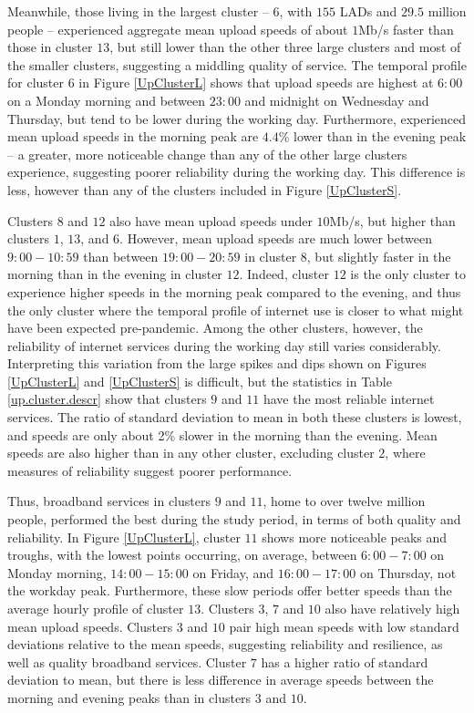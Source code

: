 \documentclass[]{interact}
\theoremstyle{plain}%
\theoremstyle{definition}
\theoremstyle{remark}
\begin{document}
Meanwhile, those living in the largest cluster -- \(6\), with \(155\)
LADs and \(29.5\) million people -- experienced aggregate mean upload
speeds of about \(1\)Mb/s faster than those in cluster \(13\), but still
lower than the other three large clusters and most of the smaller
clusters, suggesting a middling quality of service. The temporal profile
for cluster \(6\) in Figure \ref{UpClusterL} shows that upload speeds
are highest at \(6:00\) on a Monday morning and between \(23:00\) and
midnight on Wednesday and Thursday, but tend to be lower during the
working day. Furthermore, experienced mean upload speeds in the morning
peak are \(4.4\)\% lower than in the evening peak -- a greater, more
noticeable change than any of the other large clusters experience,
suggesting poorer reliability during the working day. This difference is
less, however than any of the clusters included in Figure
\ref{UpClusterS}.

Clusters \(8\) and \(12\) also have mean upload speeds under \(10\)Mb/s,
but higher than clusters \(1\), \(13\), and \(6\). However, mean upload
speeds are much lower between \(9:00-10:59\) than between
\(19:00-20:59\) in cluster \(8\), but slightly faster in the morning
than in the evening in cluster \(12\). Indeed, cluster \(12\) is the
only cluster to experience higher speeds in the morning peak compared to
the evening, and thus the only cluster where the temporal profile of
internet use is closer to what might have been expected pre-pandemic.
Among the other clusters, however, the reliability of internet services
during the working day still varies considerably. Interpreting this
variation from the large spikes and dips shown on Figures
\ref{UpClusterL} and \ref{UpClusterS} is difficult, but the statistics
in Table \ref{up.cluster.descr} show that clusters \(9\) and \(11\) have
the most reliable internet services. The ratio of standard deviation to
mean in both these clusters is lowest, and speeds are only about 2\%
slower in the morning than the evening. Mean speeds are also higher than
in any other cluster, excluding cluster \(2\), where measures of
reliability suggest poorer performance.

Thus, broadband services in clusters \(9\) and \(11\), home to over
twelve million people, performed the best during the study period, in
terms of both quality and reliability. In Figure \ref{UpClusterL},
cluster \(11\) shows more noticeable peaks and troughs, with the lowest
points occurring, on average, between \(6:00-7:00\) on Monday morning,
\(14:00-15:00\) on Friday, and \(16:00-17:00\) on Thursday, not the
workday peak. Furthermore, these slow periods offer better speeds than
the average hourly profile of cluster \(13\). Clusters \(3\), \(7\) and
\(10\) also have relatively high mean upload speeds. Clusters \(3\) and
\(10\) pair high mean speeds with low standard deviations relative to
the mean speeds, suggesting reliability and resilience, as well as
quality broadband services. Cluster \(7\) has a higher ratio of standard
deviation to mean, but there is less difference in average speeds
between the morning and evening peaks than in clusters \(3\) and \(10\).
\end{document}
